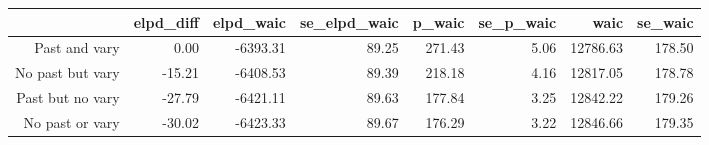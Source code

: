 \begin{table}[ht]
\centering
\begin{tabular}{rrrrrrrr}
  \hline
 & elpd\_diff & elpd\_waic & se\_elpd\_waic & p\_waic & se\_p\_waic & waic & se\_waic \\ 
  \hline
Past and vary & 0.00 & -6393.31 & 89.25 & 271.43 & 5.06 & 12786.63 & 178.50 \\ 
  No past but vary & -15.21 & -6408.53 & 89.39 & 218.18 & 4.16 & 12817.05 & 178.78 \\ 
  Past but no vary & -27.79 & -6421.11 & 89.63 & 177.84 & 3.25 & 12842.22 & 179.26 \\ 
  No past or vary & -30.02 & -6423.33 & 89.67 & 176.29 & 3.22 & 12846.66 & 179.35 \\ 
   \hline
\end{tabular}
\end{table}
